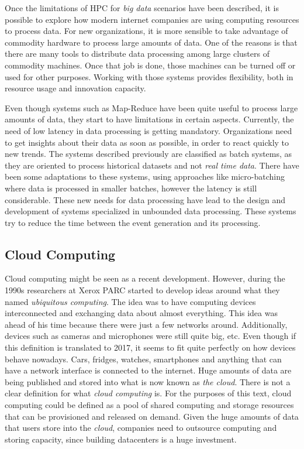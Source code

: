 Once the limitations of HPC for \textit{big data} scenarios have been described,
it is possible to explore how modern internet companies are using computing
resources to process data. For new organizations, it is more sensible to take
advantage of commodity hardware to process large amounts of data. One of the
reasons is that there are many tools to distribute data processing among large
clusters of commodity machines. Once that job is done, those machines can be
turned off or used for other purposes. Working with those systems provides
flexibility, both in resource usage and innovation capacity.

Even though systems such as Map-Reduce have been quite useful to
process large amounts of data, they start to have limitations in
certain aspects. Currently, the need of low latency in data processing
is getting mandatory. Organizations need to get insights about their
data as soon as possible, in order to react quickly to new trends. The
systems described previously are classified as batch systems, as they
are oriented to process historical datasets and not \textit{real time
  data}. There have been some adaptations to these systems, using
approaches like micro-batching where data is processed in smaller
batches, however the latency is still considerable. These new needs for data
processing have lead to the design and development of systems
specialized in unbounded data processing. These systems try to reduce
the time between the event generation and its processing. 
\subsection{Cloud Computing}

Cloud computing might be seen as a recent development. However, during the 1990s
researchers at Xerox PARC started to develop ideas around what they named
\textit{ubiquitous computing}. The idea was to have computing devices
interconnected and exchanging data about almost everything. This idea was ahead
of his time because there were just a few networks around. Additionally, devices such as
cameras and microphones were still quite big, etc. Even though if this definition is
translated to 2017, it seems to fit quite perfectly on how devices behave nowadays.
Cars, fridges, watches, smartphones and anything that can have a network
interface is connected to the internet. Huge amounts of data are being published
and stored into what is now known as \textit{the cloud}. There is not a
clear definition for what \textit{cloud computing} is. For the purposes of this
text, cloud computing could be defined as a pool of shared computing and storage
resources that can be provisioned and released on demand. Given the huge amounts
of data that users store into the \textit{cloud}, companies need to outsource
computing and storing capacity, since building datacenters is a huge investment.

